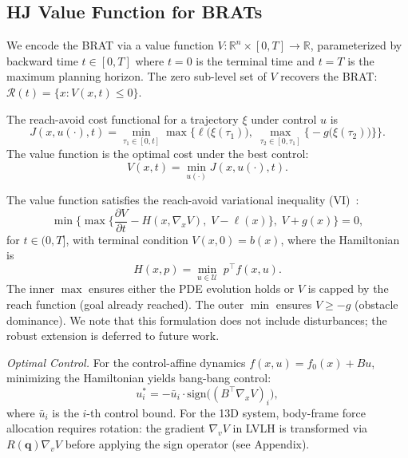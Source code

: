 \documentclass[letterpaper, 10 pt, conference]{ieeeconf}
\begin{document}
\subsection{HJ Value Function for BRATs}

We encode the BRAT via a value function $V: \mathbb{R}^n \times [0, T] \to \mathbb{R}$, parameterized by backward time $t \in [0, T]$ where $t = 0$ is the terminal time and $t = T$ is the maximum planning horizon. The zero sub-level set of $V$ recovers the BRAT: $\mathcal{R}(t) = \{x : V(x, t) \leq 0\}$.

The reach-avoid cost functional for a trajectory $\xi$ under control $u$ is
\begin{equation}\label{eq:cost}
J(x, u(\cdot), t) = \min_{\tau_1 \in [0,t]} \max\!\Big\{\ell\!\big(\xi(\tau_1)\big),\; \max_{\tau_2 \in [0,\tau_1]} \big\{-g\!\big(\xi(\tau_2)\big)\big\}\Big\}.
\end{equation}
The value function is the optimal cost under the best control:
\begin{equation}\label{eq:valfun}
V(x, t) = \min_{u(\cdot)} J(x, u(\cdot), t).
\end{equation}

The value function satisfies the reach-avoid variational inequality (VI)~\cite{fisac2015, margellos2011}:
\begin{equation}\label{eq:hjvi}
\min\!\Big\{\max\!\Big\{\frac{\partial V}{\partial t} - H(x, \nabla_x V),\; V - \ell(x)\Big\},\; V + g(x)\Big\} = 0,
\end{equation}
for $t \in (0, T]$, with terminal condition $V(x, 0) = b(x)$, where the Hamiltonian is
\begin{equation}\label{eq:hamiltonian}
H(x, p) = \min_{u \in \mathcal{U}} \; p^\top f(x, u).
\end{equation}
The inner $\max$ ensures either the PDE evolution holds or $V$ is capped by the reach function (goal already reached). The outer $\min$ ensures $V \geq -g$ (obstacle dominance). We note that this formulation does not include disturbances; the robust extension is deferred to future work.

\textit{Optimal Control.}
For the control-affine dynamics $f(x, u) = f_0(x) + Bu$, minimizing the Hamiltonian yields bang-bang control:
\begin{equation}\label{eq:bangbang}
u_i^* = -\bar{u}_i \cdot \mathrm{sign}\!\big((B^\top \nabla_x V)_i\big),
\end{equation}
where $\bar{u}_i$ is the $i$-th control bound. For the 13D system, body-frame force allocation requires rotation: the gradient $\nabla_v V$ in LVLH is transformed via $R(\mathbf{q})\nabla_v V$ before applying the sign operator (see Appendix).
\end{document}
